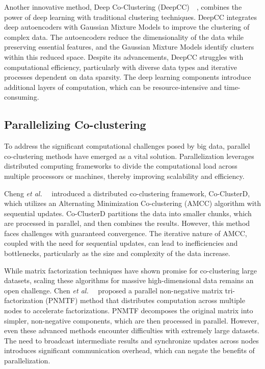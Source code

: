 \documentclass[journal]{IEEEtran}
\renewcommand{\cite}[1]{~\autocite{#1}}
\begin{document}
Another innovative method, Deep Co-Clustering (DeepCC)~\cite{dongkuanxu2019DeepCoClustering}, combines the power of deep learning with traditional clustering techniques. DeepCC integrates deep autoencoders with Gaussian Mixture Models to improve the clustering of complex data. The autoencoders reduce the dimensionality of the data while preserving essential features, and the Gaussian Mixture Models identify clusters within this reduced space. Despite its advancements, DeepCC struggles with computational efficiency, particularly with diverse data types and iterative processes dependent on data sparsity. The deep learning components introduce additional layers of computation, which can be resource-intensive and time-consuming.

\subsection{Parallelizing Co-clustering}

To address the significant computational challenges posed by big data, parallel co-clustering methods have emerged as a vital solution. Parallelization leverages distributed computing frameworks to divide the computational load across multiple processors or machines, thereby improving scalability and efficiency.

Cheng \textit{et al.}~\cite{cheng2015CoClusterDDistributedFramework} introduced a distributed co-clustering framework, Co-ClusterD, which utilizes an Alternating Minimization Co-clustering (AMCC) algorithm with sequential updates. Co-ClusterD partitions the data into smaller chunks, which are processed in parallel, and then combines the results. However, this method faces challenges with guaranteed convergence. The iterative nature of AMCC, coupled with the need for sequential updates, can lead to inefficiencies and bottlenecks, particularly as the size and complexity of the data increase.

While matrix factorization techniques have shown promise for co-clustering large datasets, scaling these algorithms for massive high-dimensional data remains an open challenge. Chen \textit{et al.}~\cite{chen2023ParallelNonNegativeMatrix} proposed a parallel non-negative matrix tri-factorization (PNMTF) method that distributes computation across multiple nodes to accelerate factorizations. PNMTF decomposes the original matrix into simpler, non-negative components, which are then processed in parallel. However, even these advanced methods encounter difficulties with extremely large datasets. The need to broadcast intermediate results and synchronize updates across nodes introduces significant communication overhead, which can negate the benefits of parallelization.
\end{document}
